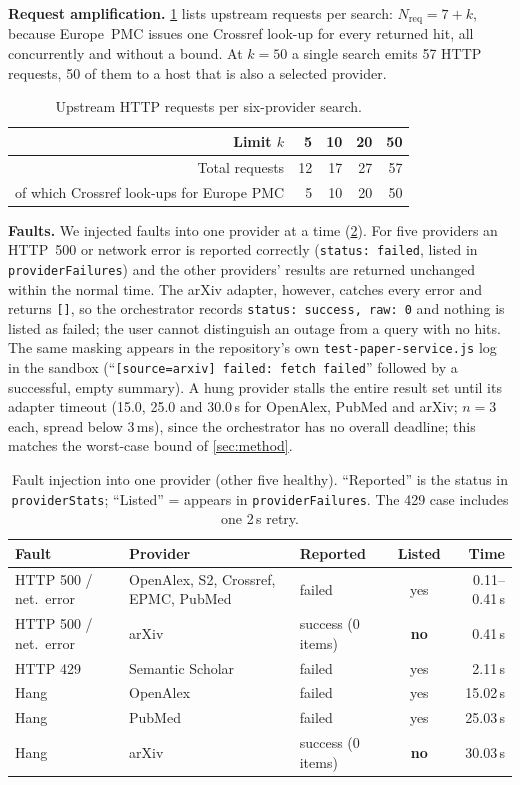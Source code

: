 \documentclass[conference]{IEEEtran}
\newcommand{\code}[1]{\texttt{\small #1}}
\begin{document}
\textbf{Request amplification.} \cref{tab:amp} lists upstream requests per search: $N_{\text{req}}=7+k$, because Europe~PMC issues one Crossref look-up for every returned hit, all concurrently and without a bound. At $k{=}50$ a single search emits 57 HTTP requests, 50 of them to a host that is also a selected provider.

\begin{table}[t]
\centering
\caption{Upstream HTTP requests per six-provider search.}
\label{tab:amp}
\footnotesize
\begin{tabular}{@{}r r r r r@{}}
\toprule
Limit $k$ & 5 & 10 & 20 & 50 \\
\midrule
Total requests & 12 & 17 & 27 & 57 \\
of which Crossref look-ups for Europe PMC & 5 & 10 & 20 & 50 \\
\bottomrule
\end{tabular}
\end{table}

\textbf{Faults.} We injected faults into one provider at a time (\cref{tab:faults}). For five providers an HTTP~500 or network error is reported correctly (\code{status: failed}, listed in \code{providerFailures}) and the other providers' results are returned unchanged within the normal time. The arXiv adapter, however, catches every error and returns \code{[]}, so the orchestrator records \code{status: success, raw: 0} and nothing is listed as failed; the user cannot distinguish an outage from a query with no hits. The same masking appears in the repository's own \code{test-paper-service.js} log in the sandbox (``\code{[source=arxiv] failed: fetch failed}'' followed by a successful, empty summary). A hung provider stalls the entire result set until its adapter timeout (15.0, 25.0 and 30.0\,s for OpenAlex, PubMed and arXiv; $n{=}3$ each, spread below 3\,ms), since the orchestrator has no overall deadline; this matches the worst-case bound of \cref{sec:method}.

\begin{table}[t]
\centering
\caption{Fault injection into one provider (other five healthy). ``Reported'' is the status in \code{providerStats}; ``Listed'' = appears in \code{providerFailures}. The 429 case includes one 2\,s retry.}
\label{tab:faults}
\footnotesize
\setlength{\tabcolsep}{3pt}
\begin{tabular}{@{}p{1.45cm} p{2.15cm} p{1.4cm} c r@{}}
\toprule
Fault & Provider & Reported & Listed & Time \\
\midrule
HTTP 500 / net.\ error & OpenAlex, S2, Crossref, EPMC, PubMed & failed & yes & 0.11--0.41\,s \\
HTTP 500 / net.\ error & arXiv & success (0 items) & \textbf{no} & 0.41\,s \\
HTTP 429 & Semantic Scholar & failed & yes & 2.11\,s \\
Hang & OpenAlex & failed & yes & 15.02\,s \\
Hang & PubMed & failed & yes & 25.03\,s \\
Hang & arXiv & success (0 items) & \textbf{no} & 30.03\,s \\
\bottomrule
\end{tabular}
\end{table}
\end{document}
